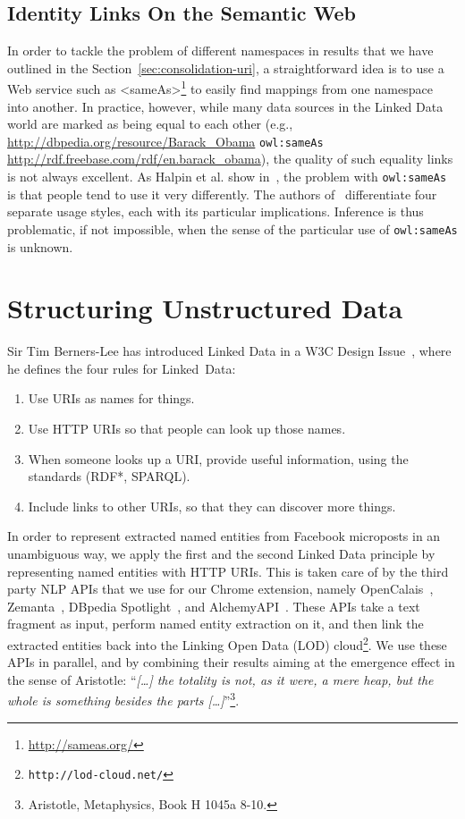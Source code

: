 \documentclass[twocolumn]{article}
\begin{document}
\subsection{Identity Links On the Semantic Web}                             \label{sec:sameasorg}
In order to tackle the problem of different namespaces in results that we have outlined in the
Section~\ref{sec:consolidation-uri}, a straightforward idea is to use a Web service such as
<sameAs>\footnote{\url{http://sameas.org/}} to easily find mappings from one namespace into another. In practice,
however, while many data sources in the Linked Data world are marked as being equal to each other (e.g.,
\url{http://dbpedia.org/resource/Barack_Obama} \texttt{owl:sameAs} \url{http://rdf.freebase.com/rdf/en.barack_obama}),
the quality of such equality links is not always excellent. As Halpin et al. show in~\cite{Halpin:SameAs}, the problem
with \texttt{owl:sameAs} is that people tend to use it very differently. The authors of~\cite{Halpin:SameAs}
differentiate four separate usage styles, each with its particular implications. Inference is thus problematic, if not
impossible, when the sense of the particular use of \texttt{owl:sameAs} is unknown.

\section{Structuring Unstructured Data}    \label{sec:services}
Sir Tim Berners-Lee has introduced Linked Data in a W3C Design Issue~\cite{TimBL:LinkedData}, where he defines the four rules for Linked~Data:
\begin{enumerate}
\item Use URIs as names for things.
\item Use HTTP URIs so that people can look up those names.
\item When someone looks up a URI, provide useful information, using the standards (RDF*, SPARQL).
\item Include links to other URIs, so that they can discover more things.
\end{enumerate}
In order to represent extracted named entities from Facebook microposts in an unambiguous way, we apply the first and the second Linked Data principle by representing named entities with HTTP URIs. This is taken care of by the third party NLP APIs that we use for our Chrome extension, namely OpenCalais~\cite{OpenCalais}, Zemanta~\cite{Zemanta}, DBpedia Spotlight~\cite{Spotlight}, and AlchemyAPI~\cite{AlchemyApi}. These APIs take a text fragment as input, perform named entity extraction on it, and then link the extracted entities back into the Linking Open Data (LOD) cloud\footnote{\texttt{http://lod-cloud.net/}}. We use these APIs in parallel, and by combining their results aiming at the emergence effect in the sense of Aristotle: ``\emph{[\ldots] the totality is not, as it were, a mere heap, but the whole is something besides the parts [\ldots]}''\footnote{Aristotle, Metaphysics, Book H 1045a 8-10.}. 
\end{document}
